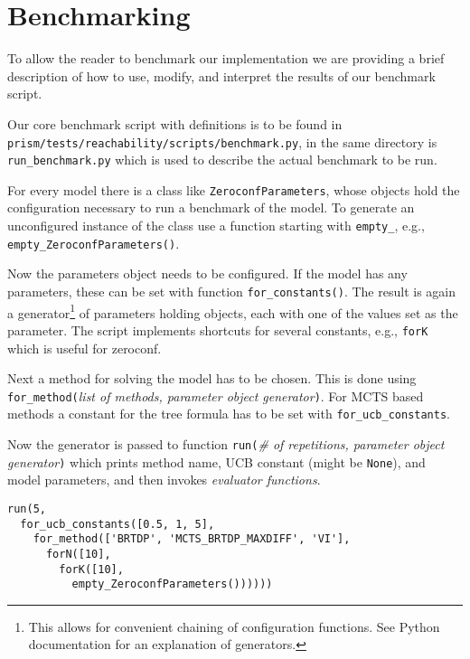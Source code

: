 \chapter{Benchmarking}

To allow the reader to benchmark our implementation we are providing a
brief description of how to use, modify, and interpret the results of
our benchmark script.

Our core benchmark script with definitions is to be found in \linebreak
\verb|prism/tests/reachability/scripts/benchmark.py|, in the same
directory is \verb|run_benchmark.py| which is used to describe the
actual benchmark to be run.

For every model there is a class like \verb|ZeroconfParameters|, whose
objects hold the configuration necessary to run a benchmark of the model.
To generate an unconfigured instance of the class use a function starting
with \verb|empty_|, e.g., \verb|empty_ZeroconfParameters()|.

Now the parameters object needs to be configured. If the model
has any parameters, these can be set with function
\verb|for_constants(|\verb|)|.
The result is again a generator\footnote{This allows for convenient
    chaining of configuration functions. See
Python documentation for an explanation of generators.} of parameters
holding objects, each with one of the values set as the parameter. The script
implements shortcuts for several constants, e.g., \verb|forK| which is
useful for zeroconf.

Next a method for solving the model has to be chosen. This is done using
\verb|for_method(|{\em list of methods, parameter object
generator}\verb|)|. For MCTS based methods a constant for the tree
formula has to be set with \verb|for_ucb_constants|.

Now the generator is passed to function \verb|run(|{\em \# of
repetitions, parameter object generator}\verb|)| which prints method
name, UCB constant (might be \verb|None|), and model parameters, and
then invokes {\em evaluator functions}.

\begin{verbatim}
run(5,
  for_ucb_constants([0.5, 1, 5],
    for_method(['BRTDP', 'MCTS_BRTDP_MAXDIFF', 'VI'],
      forN([10],
        forK([10],
          empty_ZeroconfParameters())))))
\end{verbatim}

